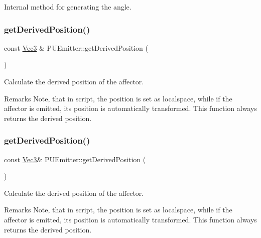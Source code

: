 Internal method for generating the angle. \mbox{\label{classPUEmitter_a157e8c65ae506cd3b94303fa5a2d8fea}} 
\subsubsection{\texorpdfstring{get\+Derived\+Position()}{getDerivedPosition()}\hspace{0.1cm}{\footnotesize\ttfamily [1/2]}}
{\footnotesize\ttfamily const \hyperlink{classVec3}{Vec3} \& P\+U\+Emitter\+::get\+Derived\+Position (\begin{DoxyParamCaption}{ }\end{DoxyParamCaption})}

Calculate the derived position of the affector. \begin{DoxyRemark}{Remarks}
Note, that in script, the position is set as localspace, while if the affector is emitted, its position is automatically transformed. This function always returns the derived position. 
\end{DoxyRemark}
\mbox{\label{classPUEmitter_a7021377a376b28f316ac4caf1412c0df}} 
\subsubsection{\texorpdfstring{get\+Derived\+Position()}{getDerivedPosition()}\hspace{0.1cm}{\footnotesize\ttfamily [2/2]}}
{\footnotesize\ttfamily const \hyperlink{classVec3}{Vec3}\& P\+U\+Emitter\+::get\+Derived\+Position (\begin{DoxyParamCaption}{ }\end{DoxyParamCaption})}

Calculate the derived position of the affector. \begin{DoxyRemark}{Remarks}
Note, that in script, the position is set as localspace, while if the affector is emitted, its position is automatically transformed. This function always returns the derived position. 
\end{DoxyRemark}
\mbox{\label{classPUEmitter_a375b1d6bd2dc610808eac3acffa1e136}} 

